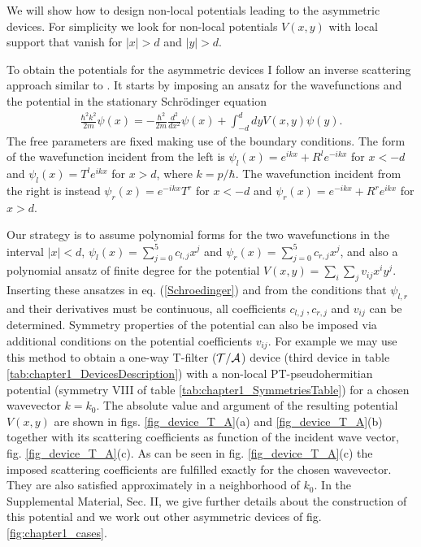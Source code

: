 We will show  how to design non-local potentials
leading to the asymmetric devices.
For simplicity we look for  non-local potentials $V(x,y)$ with local support
that vanish  for $|x| >d$ and $|y| >d$.

To obtain the potentials for the asymmetric devices I follow an inverse scattering approach similar to \cite{Palao1998}. It starts by imposing an ansatz for the wavefunctions and the potential in the stationary Schr\"{o}dinger equation
%
\begin{eqnarray}
  \frac{\hbar^2k^2}{2m} \psi (x) = - \frac{\hbar^2}{2m} \frac{d^2}{dx^2} \psi (x)
  +\!\!\int_{-d}^d \!dy V(x, y) \psi(y).
  \label{Schroedinger}
\end{eqnarray}
%
The free parameters are fixed making use of the boundary conditions.
The form of the wavefunction incident from the left is
$\psi_l(x) = e^{i k x} + R^l e^{-i k x}$ for $x < -d$ and $\psi_l (x) = T^l e^{i k x}$ for $x > d$,
where  $k=p/\hbar$.
The wavefunction incident from the right is instead
$\psi_r(x) = e^{-ikx} T^r$ for $x < -d$ and $\psi_r (x) = e^{-i k x} + R^r e^{i k x}$ for $x > d$.

Our strategy is to assume  polynomial forms for the two wavefunctions in the interval $|x| < d$,
$\psi_l (x) = \sum_{j=0}^5 c_{l,j} x^j$ and $\psi_r (x) = \sum_{j=0}^5 c_{r,j} x^j$, and also a
polynomial ansatz of finite degree for the potential $V(x,y) = \sum_i \sum_j v_{ij} x^i y^j$.
Inserting these ansatzes in eq. (\ref{Schroedinger}) and from the conditions that $\psi_{l,r}$
and their derivatives must be continuous, all coefficients $c_{l,j}\,,c_{r,j}$ and $v_{ij}$ can be determined.
Symmetry properties of the potential can also be imposed via additional conditions on
the potential coefficients $v_{ij}$. For example we may use this method to obtain a one-way T-filter ($\cal{T/A}$) device (third device in table \ref{tab:chapter1_DevicesDescription}) with a non-local PT-pseudohermitian potential (symmetry VIII of table \ref{tab:chapter1_SymmetriesTable}) for a chosen wavevector $k = k_0$. The absolute value and argument of the resulting potential $V(x,y)$ are shown in figs. \ref{fig_device_T_A}(a) and \ref{fig_device_T_A}(b) together with its scattering coefficients as function of the incident wave vector, fig. \ref{fig_device_T_A}(c). As can be seen in fig. \ref{fig_device_T_A}(c) the imposed scattering coefficients are fulfilled exactly for the chosen wavevector. They are also satisfied approximately in a neighborhood of $k_0$. In the  Supplemental Material, Sec. II, we give further details about the construction of this potential and we work out other asymmetric devices of fig. \ref{fig:chapter1_cases}.
%
%
%
%
%

